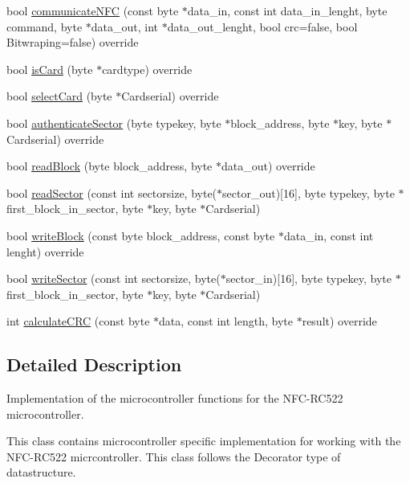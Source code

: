 \begin{DoxyCompactItemize}
\item 
bool \hyperlink{class_r_c522_aa8ec37f7914b3aa1e3866dda7e08063f}{communicate\+N\+FC} (const byte $\ast$data\+\_\+in, const int data\+\_\+in\+\_\+lenght, byte command, byte $\ast$data\+\_\+out, int $\ast$data\+\_\+out\+\_\+lenght, bool crc=false, bool Bitwraping=false) override
\item 
bool \hyperlink{class_r_c522_a6cef2c82c923eeed59bd3cb5e7a42090}{is\+Card} (byte $\ast$cardtype) override
\item 
bool \hyperlink{class_r_c522_a2b41c31a04a41b6098945b0fddcf1476}{select\+Card} (byte $\ast$Cardserial) override
\item 
bool \hyperlink{class_r_c522_a84000801a44a02cf59601400b809f5a3}{authenticate\+Sector} (byte typekey, byte $\ast$block\+\_\+address, byte $\ast$key, byte $\ast$Cardserial) override
\item 
bool \hyperlink{class_r_c522_a4a9843ee47bd24f6446bb8c327411076}{read\+Block} (byte block\+\_\+address, byte $\ast$data\+\_\+out) override
\item 
bool \hyperlink{class_r_c522_a6c6409ef5f4385e9d1efac5b2f9caed0}{read\+Sector} (const int sectorsize, byte($\ast$sector\+\_\+out)\mbox{[}16\mbox{]}, byte typekey, byte $\ast$first\+\_\+block\+\_\+in\+\_\+sector, byte $\ast$key, byte $\ast$Cardserial)
\item 
bool \hyperlink{class_r_c522_a42c197d61571667a97176f7294b0a8dd}{write\+Block} (const byte block\+\_\+address, const byte $\ast$data\+\_\+in, const int lenght) override
\item 
bool \hyperlink{class_r_c522_a11e060e686331017873edd877c3255cd}{write\+Sector} (const int sectorsize, byte($\ast$sector\+\_\+in)\mbox{[}16\mbox{]}, byte typekey, byte $\ast$first\+\_\+block\+\_\+in\+\_\+sector, byte $\ast$key, byte $\ast$Cardserial)
\item 
int \hyperlink{class_r_c522_a97d66d97883cf728889098e4a2522f27}{calculate\+C\+RC} (const byte $\ast$data, const int length, byte $\ast$result) override
\end{DoxyCompactItemize}


\subsection{Detailed Description}
Implementation of the microcontroller functions for the N\+F\+C-\/\+R\+C522 microcontroller.

This class contains microcontroller specific implementation for working with the N\+F\+C-\/\+R\+C522 micrcontroller. This class follows the Decorator type of datastructure. 

